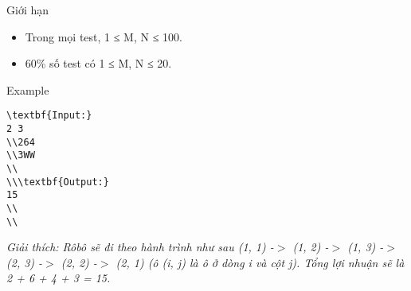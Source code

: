 Giới hạn
\begin{itemize}
	\item     Trong mọi test, 1 ≤ M, N ≤ 100.   
	\item     60\% số test có 1 ≤ M, N ≤ 20.   
\end{itemize}
Example
\begin{verbatim}
\textbf{Input:}
2 3
\\264
\\3WW
\\
\\\textbf{Output:}
15
\\
\\\end{verbatim}

\emph{    Giải thích: Rôbô sẽ đi theo hành trình như sau (1, 1) -$>$ (1, 2) -$>$ (1, 3) -$>$ (2, 3) -$>$ (2, 2) -$>$ (2, 1) (ô (i, j) là ô ở dòng i và cột j). Tổng lợi nhuận sẽ là 2 + 6 + 4 + 3 = 15.   }